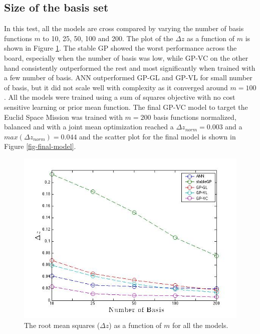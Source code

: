 \documentclass[useAMS,usenatbib,fleqn]{mn2e}
\begin{document}
\subsection{Size of the basis set}
In this test, all the models are cross compared by varying the number of basis functions $m$ to 10, 25, 50, 100 and 200. The plot of the $\Delta z$ as a function of $m$ is shown in Figure \ref{fig-different-basis}. The stable GP showed the worst performance across the board, especially when the number of basis was low, while GP-VC on the other hand consistently outperformed the rest and most significantly when trained with a few number of basis. ANN outperformed GP-GL and GP-VL for small number of basis, but it did not scale well with complexity as it converged around $m=100$. All the models were trained using a sum of squares objective with no cost sensitive learning or prior mean function. The final GP-VC model to target the Euclid Space Mission was trained with $m=200$ basis functions normalized, balanced and with a joint mean optimization reached a $\Delta z_{norm}=0.003$ and a  $max(\Delta z_{norm})=0.044$ and the scatter plot for the final model is shown in Figure \ref{fig-final-model}.

\begin{figure}
       \centering
        \includegraphics[trim = 30px 10px 20px 20px, clip=true,width=1\columnwidth]{different-basis.jpg}
        \caption{The root mean squares ($\Delta z$) as a function of $m$ for all the models. }       
       \label{fig-different-basis}
\end{figure}
\end{document}
